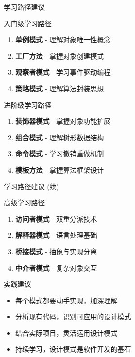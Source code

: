 \documentclass[UTF8,aspectratio=169]{beamer}
\begin{document}
\begin{frame}{学习路径建议}
    \begin{ytublock}{入门级学习路径}
        \begin{enumerate}
            \item \textbf{单例模式} - 理解对象唯一性概念
            \item \textbf{工厂方法} - 掌握对象创建模式
            \item \textbf{观察者模式} - 学习事件驱动编程
            \item \textbf{策略模式} - 理解算法封装思想
        \end{enumerate}
    \end{ytublock}

    \begin{ytublock}{进阶级学习路径}
        \begin{enumerate}
            \item \textbf{装饰器模式} - 掌握对象功能扩展
            \item \textbf{组合模式} - 理解树形数据结构
            \item \textbf{命令模式} - 学习撤销重做机制
            \item \textbf{模板方法} - 掌握算法框架设计
        \end{enumerate}
    \end{ytublock}
\end{frame}

\begin{frame}{学习路径建议 (续)}
    \begin{ytublock}{高级学习路径}
        \begin{enumerate}
            \item \textbf{访问者模式} - 双重分派技术
            \item \textbf{解释器模式} - 语言处理基础
            \item \textbf{桥接模式} - 抽象与实现分离
            \item \textbf{中介者模式} - 复杂对象交互
        \end{enumerate}
    \end{ytublock}

    \begin{ytublock}{实践建议}
        \begin{itemize}
            \item 每个模式都要动手实现，加深理解
            \item 分析现有代码，识别可应用的设计模式
            \item 结合实际项目，灵活运用设计模式
            \item 持续学习，设计模式是软件开发的基石
        \end{itemize}
    \end{ytublock}
\end{frame}
\end{document}
